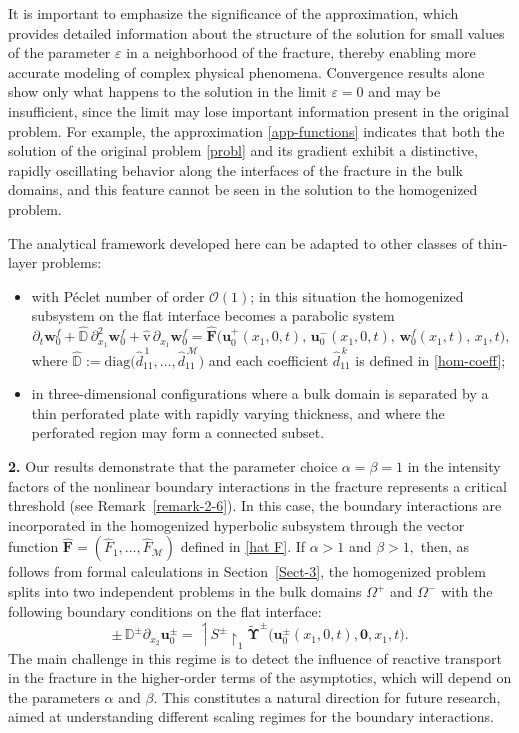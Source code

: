 \documentclass[reqno]{amsart}            %
\numberwithin{equation}{section}
\begin{document}
It is important to emphasize the significance of the approximation, which provides detailed information about the structure of the solution for small values of the parameter $\varepsilon$  in a neighborhood of the fracture, thereby enabling more accurate modeling of complex physical phenomena. Convergence results alone show only what happens to the solution in the limit $\varepsilon =0$ and may be insufficient, since the limit may lose important information present in the original problem. For example, the approximation \eqref{app-functions} indicates that both the solution of the original problem \eqref{probl} and its gradient exhibit a distinctive, rapidly oscillating behavior along the interfaces of the fracture in the bulk domains, and this feature cannot be seen in the solution to the homogenized problem.


The analytical framework developed here can be adapted to other classes of thin-layer problems:
\begin{itemize}
	\item
	with Péclet number of order $\mathcal{O}(1)$; in this situation the homogenized subsystem on the flat interface becomes a parabolic system
	\[
	\partial_t \mathbf{w}^f_0  
	+ \widehat{\mathbb{D}}\, \partial^2_{x_1} \mathbf{w}^f_0
	+ \hat{\mathrm{v}}\, \partial_{x_1} \mathbf{w}^f_0
	= \widehat{\mathbf{F}}\big(\mathbf{u}^+_0(x_1,0,t),\, \mathbf{u}^-_0(x_1,0,t),\, \mathbf{w}^f_0(x_1,t),\, x_1, t\big),
	\]
	where $\widehat{\mathbb{D}} := \mathrm{diag}\big(\widehat{d}^{\,1}_{11},\ldots,\widehat{d}^{\,\mathcal{M}}_{11}\big)$ and each coefficient $\widehat{d}^{\,k}_{11}$ is defined in \eqref{hom-coeff};
	\item
	in three-dimensional configurations where a bulk domain is separated by a thin perforated plate with rapidly varying thickness, and where the perforated region may form a connected subset.
\end{itemize}
 

\smallskip 

\textbf{2.}
Our results demonstrate that the parameter choice  \(\alpha=\beta=1\) in the intensity factors of the nonlinear boundary interactions in the fracture represents a  critical threshold (see Remark~\ref{remark-2-6}). In this case, the boundary interactions are incorporated in the homogenized hyperbolic subsystem through the vector function $\widehat{\mathbf{F}}=(\widehat{F}_1,\ldots,\widehat{F}_\mathcal{M})$ defined in \eqref{hat F}. If 
$\alpha >1$ and $\beta > 1,$ then, as follows from formal calculations in Section~\ref{Sect-3}, the homogenized problem splits into two independent problems in the bulk domains $\Omega^+$ and $\Omega^-$ with the following boundary conditions on the flat interface:
$$
\pm\, \mathbb{D}^\pm \partial_{x_2} \mathbf{u}^\pm_0 =  
\upharpoonleft\!\! {S}^\pm\!\!\upharpoonright_1\widetilde{\boldsymbol{\Upsilon}}^\pm\big(\mathbf{u}^\pm_0(x_1,0,t), \mathbf{0}, x_1, t\big).
$$
The main challenge in this regime is to detect the influence of reactive transport in the fracture in the higher-order terms of the asymptotics, which will depend on the parameters $\alpha$ and $\beta.$ This constitutes a natural direction for future research, aimed at understanding different scaling regimes for the boundary interactions.
\end{document}
